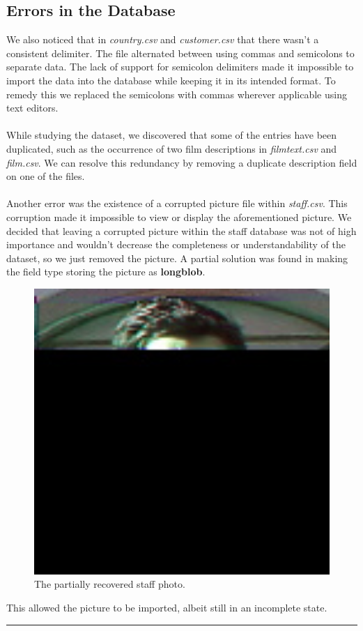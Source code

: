 \documentclass[openany]{article}
\begin{document}
\subsection{Errors in the Database}
	We also noticed that in \emph{country.csv} and \emph{customer.csv} that there wasn’t a consistent delimiter. The file alternated between using commas 
	and semicolons to separate data. The lack of support for semicolon delimiters made it impossible to import the data into the database while keeping it in its intended format. 
	To remedy this we replaced the semicolons with commas wherever applicable using text editors.
	\\\\
	While studying the dataset, we discovered that some of the entries have been duplicated, such as the occurrence of two film descriptions in \emph{film\textunderscore text.csv} and \emph{film.csv}. We can resolve this redundancy by removing a duplicate description field on one of the files.
	\\\\
	Another error was the existence of a corrupted picture file within \emph{staff.csv}. This corruption made it impossible to view or display the aforementioned picture. 
	We decided that leaving a corrupted picture within the staff database was not of high importance and wouldn’t decrease the completeness or understandability of the dataset,
	so we just removed the picture. A partial solution was found in making the field type storing the picture as \textbf{longblob}. 
	\begin{figure}[H]
		\includegraphics[width=13cm]{staff-picture}
		\caption{The partially recovered staff photo.}
	\end{figure}
	This allowed the picture to be imported, albeit still in an incomplete state. 
	\\
	\rule{\textwidth}{0.4pt}
\end{document}

